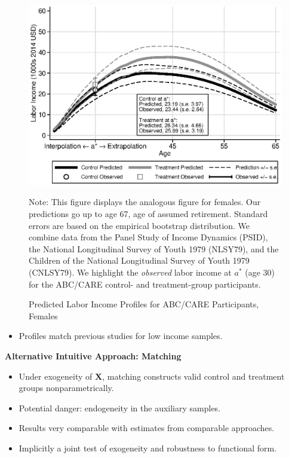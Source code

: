 \documentclass[static]{JJH-Beamer}
\begin{document}
\begin{frame}

\begin{figure}[H]\addtocounter{figure}{-1}
\caption{Predicted Labor Income Profiles for ABC/CARE Participants, Females}\label{fig:labor-income-profilesa}
\begin{center}
\includegraphics[width=.6\textwidth]{output/labor_25-65_pset1_mset3_female.eps}
\end{center}
\tiny \flushleft Note: This figure displays the analogous figure for females. Our predictions go up to age 67, age of assumed retirement. Standard errors are based on the empirical bootstrap distribution. We combine data from the Panel Study of Income Dynamics (PSID), the National Longitudinal Survey of Youth 1979 (NLSY79), and the Children of the National Longitudinal Survey of Youth 1979 (CNLSY79). We highlight the \textit{observed} labor income at $a^*$ (age 30) for the ABC/CARE control- and treatment-group participants.\\
\end{figure}

\end{frame}

\begin{itemize}
\item Profiles match previous studies for low income samples.
\end{itemize}

\begin{frame}

\begin{center}
\textbf{Alternative Intuitive Approach: Matching}
\end{center}

\begin{itemize}
\item Under exogeneity of $\bm{X}$, matching constructs valid control and treatment groups nonparametrically.
\item Potential danger: endogeneity in the auxiliary samples.
\item Results very comparable with estimates from comparable approaches.
\item Implicitly a joint test of exogeneity and robustness to functional form.
\end{itemize}

\end{frame}
\end{document}
